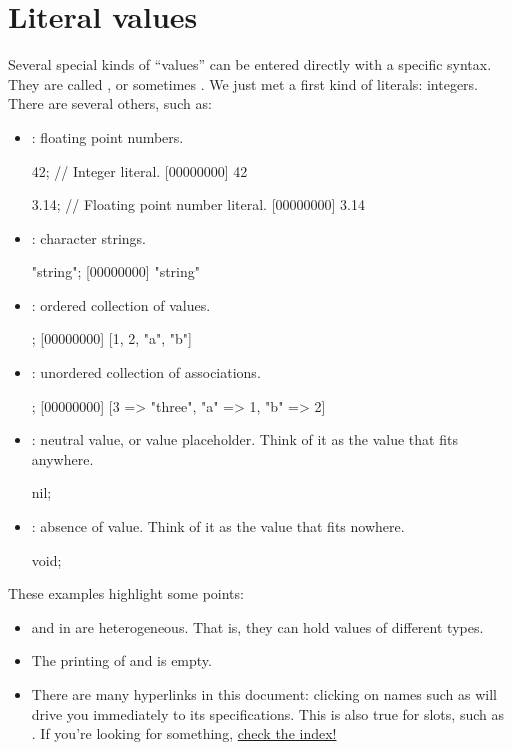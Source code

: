 \section{Literal values}

Several special kinds of ``values'' can be entered directly with a specific
syntax.  They are called , or sometimes .
We just met a first kind of literals: integers.  There are several others,
such as:

\begin{itemize}
\item {}: floating point numbers.
\begin{urbiscript}
42; // Integer literal.
[00000000] 42

3.14; // Floating point number literal.
[00000000] 3.14
\end{urbiscript}

\item {}: character strings.
\begin{urbiscript}
"string";
[00000000] "string"
\end{urbiscript}

\item {}: ordered collection of values.
\begin{urbiscript}
[1, 2, "a", "b"];
[00000000] [1, 2, "a", "b"]
\end{urbiscript}

\item {}: unordered collection of
  associations.
\begin{urbiscript}
["a" => 1, "b" => 2, 3 => "three"];
[00000000] [3 => "three", "a" => 1, "b" => 2]
\end{urbiscript}

\item {}: neutral value, or value placeholder. Think of it as
  the value that fits anywhere.
\begin{urbiscript}
nil;
\end{urbiscript}

\item {}: absence of value. Think of it as the value that fits
  nowhere.
\begin{urbiscript}
void;
\end{urbiscript}
\end{itemize}

These examples highlight some points:
\begin{itemize}
\item {} and  in
  \us are heterogeneous. That is, they can hold values of different types.
\item The printing of  and  is empty.
\item There are many hyperlinks in this document: clicking on names such as
   will drive you immediately to its specifications.
  This is also true for slots, such as .  If you're
  looking for something, \hyperref[sec:index]{check the index!}
\end{itemize}

